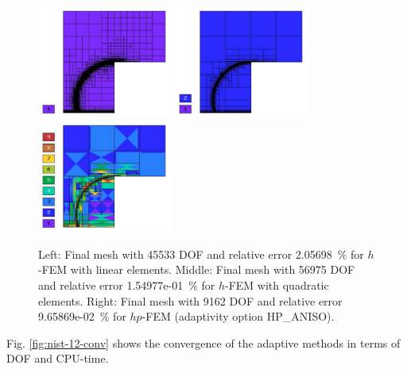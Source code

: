 \documentclass[12pt]{elsarticle}
\begin{document}
\begin{figure}[H]
\centering
\includegraphics[height=3.7cm]{mafig72.pdf}
\includegraphics[height=3.7cm]{mafig73.pdf}
\includegraphics[height=3.7cm]{mafig74.pdf}
\caption{
Left: Final mesh with 45533 DOF and relative error 2.05698~\% for $h$-FEM with linear elements.
Middle: Final mesh with 56975 DOF and relative error 1.54977e-01~\% for $h$-FEM with quadratic elements.
Right: Final mesh with 9162 DOF and relative error 9.65869e-02~\% for $hp$-FEM (adaptivity option HP\_ANISO).}
\label{fig:nist-12-hp-aniso}
\end{figure}

Fig. \ref{fig:nist-12-conv} shows the convergence of the adaptive methods in terms of DOF and CPU-time.
\end{document}
